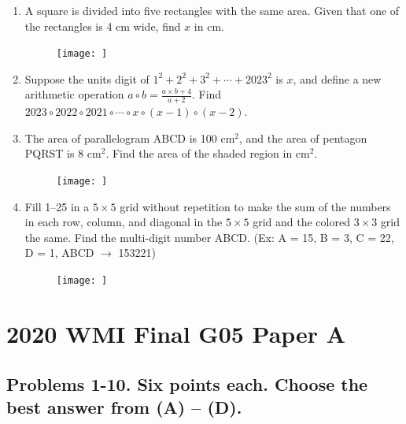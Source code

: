 \documentclass[12pt]{scrartcl}
\begin{document}
\begin{enumerate}
    \item A square is divided into five rectangles with the same area. Given that one of the rectangles is 4 cm wide, find $x$ in cm.
    \begin{figure}[h]
        \centering
        \texttt{[image: ]}
    \end{figure}

    \item Suppose the units digit of $1^2 + 2^2 + 3^2 + \cdots + 2023^2$ is $x$, and define a new arithmetic operation $a \circ b = \frac{a \times b + 4}{a + 2}$. Find $2023 \circ 2022 \circ 2021 \circ \cdots \circ x \circ (x-1) \circ (x-2)$.

    \item The area of parallelogram ABCD is 100 cm$^2$, and the area of pentagon PQRST is 8 cm$^2$. Find the area of the shaded region in cm$^2$.
    \begin{figure}[h]
        \centering
        \texttt{[image: ]}
    \end{figure}

    \item Fill 1--25 in a $5 \times 5$ grid without repetition to make the sum of the numbers in each row, column, and diagonal in the $5 \times 5$ grid and the colored $3 \times 3$ grid the same. Find the multi-digit number ABCD. (Ex: A = 15, B = 3, C = 22, D = 1, ABCD $\rightarrow$ 153221)
    \begin{figure}[h]
        \centering
        \texttt{[image: ]}
    \end{figure}
\end{enumerate}

\section*{2020 WMI Final G05 Paper A}

\subsection*{Problems 1-10. Six points each. Choose the best answer from (A) -- (D).}
\end{document}

